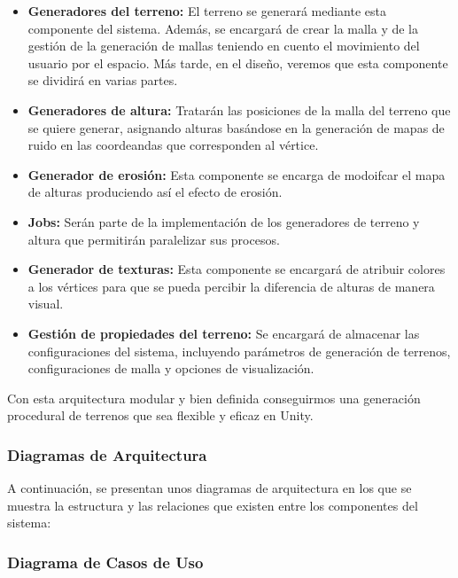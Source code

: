 \begin{itemize}
    \item \textbf{Generadores del terreno:} El terreno se generará mediante esta componente del sistema. Además, se encargará de crear la malla y de la gestión de la generación de mallas teniendo en cuento el movimiento del usuario por el espacio. Más tarde, en el diseño, veremos que esta componente se dividirá en varias partes.

    \item \textbf{Generadores de altura:} Tratarán las posiciones de la malla del terreno que se quiere generar, asignando alturas basándose en la generación de mapas de ruido en las coordeandas que corresponden al vértice.
    
    \item \textbf{Generador de erosión:} Esta componente se encarga de modoifcar el mapa de alturas produciendo así el efecto de erosión.
    
    \item \textbf{Jobs:} Serán parte de la implementación de los generadores de terreno y altura que permitirán paralelizar sus procesos.

    \item \textbf{Generador de texturas:} Esta componente se encargará de atribuir colores a los vértices para que se pueda percibir la diferencia de alturas de manera visual.    
        
    \item \textbf{Gestión de propiedades del terreno:} Se encargará de almacenar las configuraciones del sistema, incluyendo parámetros de generación de terrenos, configuraciones de malla y opciones de visualización.
\end{itemize}

Con esta arquitectura modular y bien definida conseguirmos una generación procedural de terrenos que sea flexible y eficaz en Unity.

\subsubsection{Diagramas de Arquitectura}
A continuación, se presentan unos diagramas de arquitectura en los que se muestra la estructura y las relaciones que existen entre los componentes del sistema:

\subsubsection{Diagrama de Casos de Uso}

